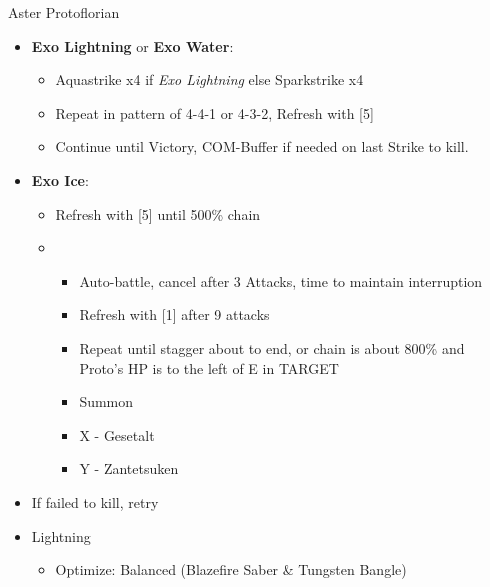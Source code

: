 \begin{battle}{Aster Protoflorian}
\begin{multicols}{2}
\begin{itemize}
      \item \textbf{Exo Lightning} or \textbf{Exo Water}:
        \begin{itemize}
            \item Aquastrike x4 if \textit{Exo Lightning} else Sparkstrike x4
            \item Repeat in pattern of 4-4-1 or 4-3-2, Refresh with [5]
            \item Continue until Victory, COM-Buffer if needed on last Strike to kill.
        \end{itemize}
        \item \textbf{Exo Ice}:
        \begin{itemize}
            \item Refresh with [5] until 500\% chain
            \item \sixth
            \begin{itemize}
                \item Auto-battle, cancel after 3 Attacks, time to maintain interruption
                \item Refresh with [1] after 9 attacks
                \item Repeat until stagger about to end, or chain is about 800\% and Proto's HP is to the left of E in TARGET
                \item Summon
                \item X - Gesetalt
                \item Y - Zantetsuken
            \end{itemize}
    \end{itemize}
    \item If failed to kill, retry
\end{itemize}
\end{multicols}
\end{battle}
\begin{menu}
    \begin{itemize}
        \equip
        \begin{itemize}
            \item Lightning
            \begin{itemize}
            		\item Optimize: Balanced (Blazefire Saber \& Tungsten Bangle)
            \end{itemize}
        \end{itemize}
    \end{itemize}
\end{menu}



